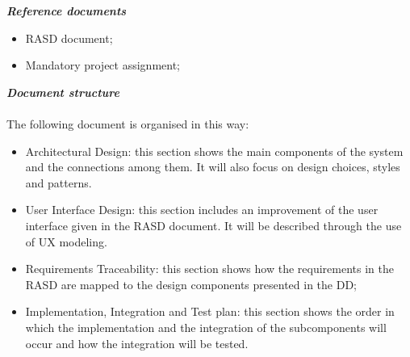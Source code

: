 \begin{legal}
\begin{itemize}
			\end{itemize}
		\item \textit{\textbf{Reference documents}}\\
			\begin{itemize}
				\item RASD document;
				\item Mandatory project assignment;\\
			\end{itemize}
		\item \textit{\textbf{Document structure}}\\\\
		The following document is organised in this way:
		\begin{itemize}
				\item Architectural Design: this section shows the main components of the system and the connections among them. It will also focus on design choices, styles and patterns.
				\item User Interface Design: this section includes an improvement of the user interface given in the RASD document. It will be described through the use of UX modeling.
				\item Requirements Traceability: this section shows how the requirements in the RASD are mapped to the design components presented in the DD;
				\item Implementation, Integration and Test plan: this section shows the order in which the implementation and the integration of the subcomponents will occur and how the integration will be tested.\\\\
			\end{itemize}
  	\end{legal}

